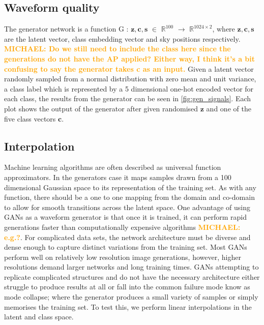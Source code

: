 \documentclass[12pt]{iopart}
\newcommand{\michael}[1]{\textbf{\textcolor{orange}{MICHAEL: #1}}}
\begin{document}
\subsection{Waveform quality}
The generator network is a function G : $\mathbf{z},\mathbf{c},\mathbb{\textbf{s}}$ $\in$ $\mathbb{R}^{100}$ $\to$ $\mathbb{R}^{1024\times2}$, where $\mathbf{z},\mathbf{c},\mathbb{\textbf{s}}$ are the latent vector, class embedding vector and sky positions respectively. \michael{Do we still need to include the class here since the generations do not have the AP applied? Either way, I think it's a bit confusing to say the generator takes c as an input.} Given a latent vector randomly sampled from a normal distribution with zero mean and unit variance, a class label which is represented by a 5 dimensional one-hot encoded vector for each class, the results from the generator can be seen in \cref{fig:gen_signals}. Each plot shows the output of the generator after given randomised $\mathbf{z}$ and one of the five class vectors $\mathbf{c}$.

\subsection{Interpolation}
Machine learning algorithms are often described as universal function approximators. In the generators case it maps samples drawn from a 100 dimensional Gaussian space to its representation of the training set. As with any function, there should be a one to one mapping from the domain and co-domain to allow for smooth transitions across the latent space. One advantage of using GANs as a waveform generator is that once it is trained, it can perform rapid generations faster than computationally
expensive algorithms \michael{e.g.?}. For complicated data sets, the network architecture must be diverse and dense enough to capture distinct variations from the training set. Most GANs perform well on relatively low resolution image generations, however, higher resolutions demand larger networks and long training times. GANs attempting to replicate complicated structures and do not have the necessary architecture either struggle to produce results at all or fall into the common failure mode know as mode collapse; where the generator produces a small variety of samples or simply memorises the training set. To test this, we perform linear interpolations in the latent and class space. 
\end{document}
